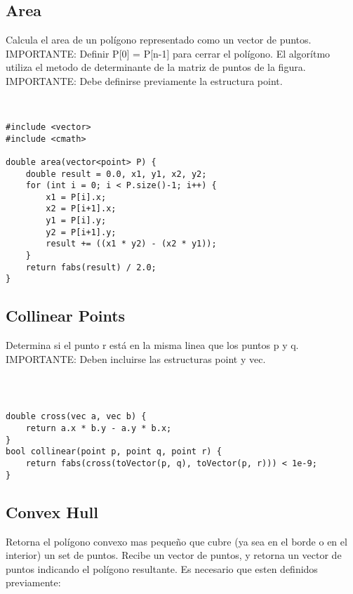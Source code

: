 \documentclass[11pt,letterpaper,twocolumn,twosided]{article}
\begin{document}
\subsection{Area}
Calcula el area de un pol\'igono representado como un vector de puntos. IMPORTANTE: Definir P[0] = P[n-1] para cerrar el pol\'igono. El algor\'itmo utiliza el metodo de determinante de la matriz de puntos de la figura. IMPORTANTE: Debe definirse previamente la estructura point.
\begin{lstlisting}


#include <vector>
#include <cmath>

double area(vector<point> P) {
	double result = 0.0, x1, y1, x2, y2;
  	for (int i = 0; i < P.size()-1; i++) {
    	x1 = P[i].x; 
    	x2 = P[i+1].x;
    	y1 = P[i].y; 
    	y2 = P[i+1].y;
    	result += ((x1 * y2) - (x2 * y1));
  	}
  	return fabs(result) / 2.0; 
}
\end{lstlisting}

\subsection{Collinear Points}
Determina si el punto r est\'a en la misma linea que los puntos p y q. IMPORTANTE: Deben incluirse las estructuras point y vec.
\begin{lstlisting}



double cross(vec a, vec b) { 
	return a.x * b.y - a.y * b.x; 
}
bool collinear(point p, point q, point r) {
	return fabs(cross(toVector(p, q), toVector(p, r))) < 1e-9; 
}
\end{lstlisting}

\subsection{Convex Hull}
Retorna el pol\'igono convexo mas peque\~no que cubre (ya sea en el borde o en el interior) un set de puntos. Recibe un vector de puntos, y retorna un vector de puntos indicando el pol\'igono resultante. Es necesario que esten definidos previamente: 
\end{document}
